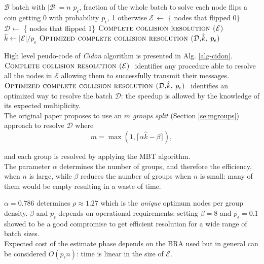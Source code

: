 \documentclass[12pt,a4paper]{report}
\newcommand{\pc}{p_{\epsilon}}
\newcommand{\algname}[1]{\ensuremath{\mbox{\sc #1}}}
\begin{document}
 \begin{algorithm}[h!]
\begin{algorithmic}[1]
	\REQUIRE $\mathcal{B}$ batch with $|\mathcal{B}|=n$
	\REQUIRE $\pc$, fraction of the whole batch to solve
	\STATE {}
	\STATE each node flips a coin getting 0 with probability $\pc$, 1 otherwise
	\STATE $\mathcal{E} \,\gets$ \{ nodes that flipped 0\}
	\STATE $\mathcal{D} \gets$ \{ nodes that flipped 1\}
	\STATE \algname{Complete collision resolution ($\mathcal{E}$) }
	\STATE  $\hat{k} \gets |\mathcal{E}|/\pc$
	\STATE {}
	\STATE \algname{Optimized complete collision resolution ($\mathcal{D}$,$\hat{k}$, $\pc$) }
	\end{algorithmic}
\caption{\algname{Cidon($\mathcal{B}$, $\pc$)}}
\label{alg-cidon}
\end{algorithm}
 High level peudo-code of \emph{Cidon} algorithm is presented in Alg. \ref{alg-cidon}.\\ \algname{Complete collision resolution ($\mathcal{E}$) } identifies any procedure able to resolve all the nodes in $\mathcal{E}$ allowing them to successfully transmit their messages. \algname{Optimized complete collision resolution ($\mathcal{D}$,$\hat{k}$, $\pc$) } identifies an optimized way to resolve the batch $\mathcal{D}$: the speedup is allowed by the knowledge of its expected multiplicity.\\
 
 The original paper proposes to use an \emph{$m$ groups split} (Section \ref{se:mgroups}) approach to resolve $\mathcal{D}$ where 
 \begin{equation}
m = \max(1, \lceil\alpha \hat{k}-\beta\rceil),
\end{equation}

and each group is resolved by applying the MBT algorithm.\\
The parameter $\alpha$ determines the number of groups, and therefore the efficiency, when $n$ is large, while $\beta$  reduces the number of groups when $n$ is small: many of them would be empty resulting in a waste of time. 
 
 $\alpha=0.786$ determines $\rho\approx 1.27$ which is the \emph{unique} optimum  nodes per group density. $\beta$ and $\pc$ depends on operational requirements: setting $\beta=8$ and  $\pc=0.1$ showed to be a good compromise to get efficient resolution for a wide range of batch sizes.\\  
 
Expected  cost of the estimate phase depends on the BRA used but in general can be considered $O(\pc n)$: time is linear in the size of $\mathcal{E}$.
\end{document}
